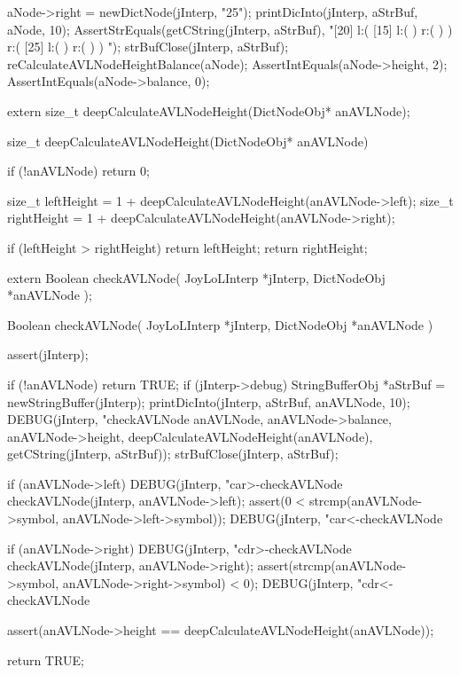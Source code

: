   aNode->right = newDictNode(jInterp, "25");
  printDicInto(jInterp, aStrBuf, aNode, 10);
  AssertStrEquals(getCString(jInterp, aStrBuf),
  "[20] l:( [15] l:(  ) r:(  )  ) r:( [25] l:(  ) r:(  )  ) ");
  strBufClose(jInterp, aStrBuf);
  reCalculateAVLNodeHeightBalance(aNode);
  AssertIntEquals(aNode->height, 2);
  AssertIntEquals(aNode->balance, 0);
\stopCTest
\stopTestCase
\stopTestSuite

\startCHeader
extern size_t deepCalculateAVLNodeHeight(DictNodeObj* anAVLNode);
\stopCHeader

\startCCode
size_t deepCalculateAVLNodeHeight(DictNodeObj* anAVLNode) {
  if (!anAVLNode) return 0;

  size_t leftHeight = 1 + deepCalculateAVLNodeHeight(anAVLNode->left);
  size_t rightHeight = 1 + deepCalculateAVLNodeHeight(anAVLNode->right);

  if (leftHeight > rightHeight) return leftHeight;
  return rightHeight;
}
\stopCCode

\startCHeader
extern Boolean checkAVLNode(
  JoyLoLInterp *jInterp,
  DictNodeObj  *anAVLNode
);
\stopCHeader

\startCCode
Boolean checkAVLNode(
  JoyLoLInterp *jInterp,
  DictNodeObj  *anAVLNode
) {
  assert(jInterp);
  
  if (!anAVLNode) return TRUE;
  if (jInterp->debug) {
    StringBufferObj *aStrBuf = 
      newStringBuffer(jInterp);
    printDicInto(jInterp, aStrBuf, anAVLNode, 10);
    DEBUG(jInterp, "checkAVLNode %
          anAVLNode, anAVLNode->balance, anAVLNode->height,
          deepCalculateAVLNodeHeight(anAVLNode),
          getCString(jInterp, aStrBuf));
    strBufClose(jInterp, aStrBuf);
  }

  if (anAVLNode->left) {
      DEBUG(jInterp, "car>-checkAVLNode %
      checkAVLNode(jInterp, anAVLNode->left);
      assert(0 < strcmp(anAVLNode->symbol,
                      anAVLNode->left->symbol));
    DEBUG(jInterp, "car<-checkAVLNode %
  }

  if (anAVLNode->right) {
    DEBUG(jInterp, "cdr>-checkAVLNode %
    checkAVLNode(jInterp, anAVLNode->right);
    assert(strcmp(anAVLNode->symbol,
                  anAVLNode->right->symbol) < 0);
    DEBUG(jInterp, "cdr<-checkAVLNode %
  }

  assert(anAVLNode->height == deepCalculateAVLNodeHeight(anAVLNode));

  return TRUE;
}
\stopCCode

